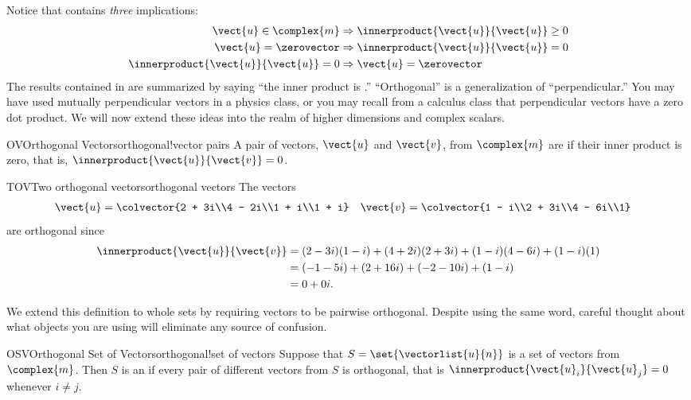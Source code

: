 %
Notice that  contains {\em three} implications:
\begin{align*}
\vect{u}\in\complex{m}&\Rightarrow\innerproduct{\vect{u}}{\vect{u}}\geq 0\\
\vect{u}=\zerovector&\Rightarrow\innerproduct{\vect{u}}{\vect{u}}=0\\
\innerproduct{\vect{u}}{\vect{u}}=0&\Rightarrow\vect{u}=\zerovector
\end{align*}
%
The results contained in  are summarized by saying ``the inner product is .''
%
%
``Orthogonal'' is a generalization of ``perpendicular.''  You may have used mutually perpendicular vectors in a physics class, or you may recall from a calculus class that perpendicular vectors have a zero dot product.  We will now extend these ideas into the realm of higher dimensions and complex scalars.
%
%
\begin{definition}{OV}{Orthogonal Vectors}{orthogonal!vector pairs}
A pair of vectors, $\vect{u}$ and $\vect{v}$, from $\complex{m}$ are  if their inner product is zero, that is, $\innerproduct{\vect{u}}{\vect{v}}=0$.
\end{definition}
%
%
\begin{example}{TOV}{Two orthogonal vectors}{orthogonal vectors}
The vectors
%
\begin{align*}
\vect{u}&=\colvector{2 + 3i\\4 - 2i\\1 + i\\1 + i}
&
\vect{v}&=\colvector{1 - i\\2 + 3i\\4 - 6i\\1}
\end{align*}
%
are orthogonal since
%
\begin{align*}
\innerproduct{\vect{u}}{\vect{v}}
&=(2-3i)(1-i)+(4+2i)(2+3i)+(1-i)(4-6i)+(1-i)(1)\\
&=(-1-5i)+(2+16i)+(-2-10i)+(1-i)\\
&=0+0i.
\end{align*}
%
\end{example}
%
We extend this definition to whole sets by requiring vectors to be pairwise orthogonal.  Despite using the same word, careful thought about what objects you are using will eliminate any source of confusion.
%
\begin{definition}{OSV}{Orthogonal Set of Vectors}{orthogonal!set of vectors}
Suppose that $S=\set{\vectorlist{u}{n}}$ is a set of vectors from $\complex{m}$.  Then $S$ is an  if every pair of different vectors from $S$ is orthogonal, that is $\innerproduct{\vect{u}_i}{\vect{u}_j}=0$ whenever $i\neq j$.
\end{definition}
